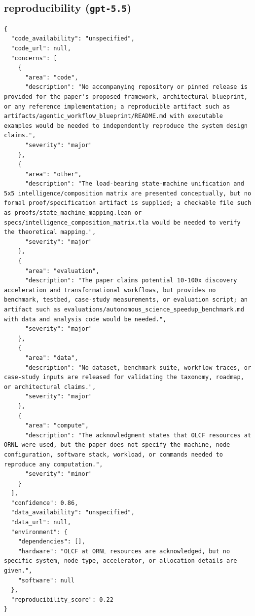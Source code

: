 \documentclass[11pt]{article}
\begin{document}
\subsection*{reproducibility (\texttt{gpt-5.5})}
\begin{verbatim}
{
  "code_availability": "unspecified",
  "code_url": null,
  "concerns": [
    {
      "area": "code",
      "description": "No accompanying repository or pinned release is provided for the paper's proposed framework, architectural blueprint, or any reference implementation; a reproducible artifact such as artifacts/agentic_workflow_blueprint/README.md with executable examples would be needed to independently reproduce the system design claims.",
      "severity": "major"
    },
    {
      "area": "other",
      "description": "The load-bearing state-machine unification and 5x5 intelligence/composition matrix are presented conceptually, but no formal proof/specification artifact is supplied; a checkable file such as proofs/state_machine_mapping.lean or specs/intelligence_composition_matrix.tla would be needed to verify the theoretical mapping.",
      "severity": "major"
    },
    {
      "area": "evaluation",
      "description": "The paper claims potential 10-100x discovery acceleration and transformational workflows, but provides no benchmark, testbed, case-study measurements, or evaluation script; an artifact such as evaluations/autonomous_science_speedup_benchmark.md with data and analysis code would be needed.",
      "severity": "major"
    },
    {
      "area": "data",
      "description": "No dataset, benchmark suite, workflow traces, or case-study inputs are released for validating the taxonomy, roadmap, or architectural claims.",
      "severity": "major"
    },
    {
      "area": "compute",
      "description": "The acknowledgment states that OLCF resources at ORNL were used, but the paper does not specify the machine, node configuration, software stack, workload, or commands needed to reproduce any computation.",
      "severity": "minor"
    }
  ],
  "confidence": 0.86,
  "data_availability": "unspecified",
  "data_url": null,
  "environment": {
    "dependencies": [],
    "hardware": "OLCF at ORNL resources are acknowledged, but no specific system, node type, accelerator, or allocation details are given.",
    "software": null
  },
  "reproducibility_score": 0.22
}
\end{verbatim}
\end{document}
